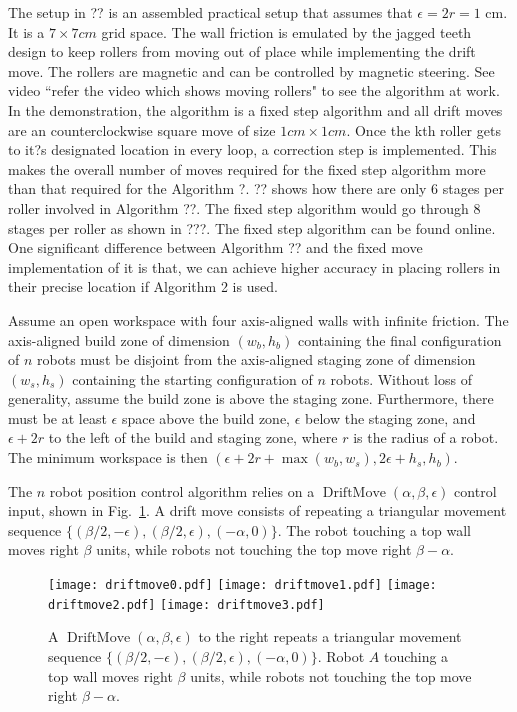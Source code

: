 The setup in ?? is an assembled practical setup that assumes that $\epsilon=2r = 1$ cm. It is a $7\times 7cm$ grid space. The wall friction is emulated by the jagged teeth design to keep rollers from moving out of place while implementing the drift move. The rollers are magnetic and can be controlled by magnetic steering. See video ``refer the video which shows moving rollers"  to see the algorithm at work. In the demonstration, the algorithm is a fixed step algorithm and all drift moves are an counterclockwise square move  of size $1cm\times1cm$. Once the kth roller gets to it?s designated location in every loop, a correction step is implemented. This makes the overall number of moves required for the fixed step algorithm more than that required for the Algorithm ?. ?? shows how there are only 6 stages per roller involved in Algorithm ??. The fixed step algorithm would go through 8 stages per roller as shown in ???. The fixed step algorithm can be found online. One significant difference between Algorithm ?? and the fixed move implementation of it is that, we can achieve higher accuracy in placing rollers in their precise location if Algorithm 2 is used. 


Assume an open workspace with four axis-aligned walls with infinite friction.
The axis-aligned build zone of dimension $(w_b, h_b)$ containing the final configuration of $n$ robots must be disjoint from the axis-aligned staging zone of dimension $(w_s, h_s)$  containing the starting configuration of $n$ robots. Without loss of generality, assume the build zone  is above the staging zone. 
Furthermore, there must be at least $\epsilon$ space above the build zone, $\epsilon$ below the staging zone, and $\epsilon + 2r$ to the left of the build and staging zone, where $r$ is the radius of a robot.  The minimum workspace is then $(\epsilon + 2r + \max(w_b,w_s), 2\epsilon + h_s,h_b)$.

The $n$ robot position control algorithm relies on a $\operatorname{DriftMove}(\alpha, \beta, \epsilon)$ control input, shown in Fig.\  \ref{fig:driftmove}.
A drift move consists of repeating a triangular movement sequence $\{ (\beta/2,-\epsilon),(\beta/2,\epsilon),(-\alpha,0)\}$. The robot touching a top wall moves right $\beta$ units, while robots not touching the top move right $\beta-\alpha$.

\begin{figure}
\begin{center}
\texttt{[image: driftmove0.pdf]}
	\texttt{[image: driftmove1.pdf]}
	\texttt{[image: driftmove2.pdf]}
	\texttt{[image: driftmove3.pdf]}
\end{center}
\vspace{-1em}
\caption{\label{fig:driftmove}
A  $\operatorname{DriftMove}(\alpha, \beta, \epsilon)$ to the right repeats a triangular movement sequence $\{ (\beta/2,-\epsilon),(\beta/2,\epsilon),(-\alpha,0)\}$. Robot $A$ touching a top wall moves right $\beta$ units, while robots not touching the top move right $\beta-\alpha$.}
\vspace{-1em}
\end{figure}

